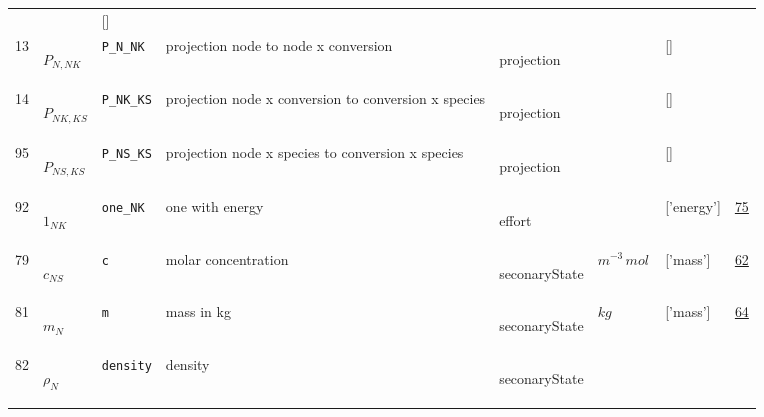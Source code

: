 \begin{longtable}{|p{1cm}|p{3cm}|p{3cm}|p{7cm}|p{3.0cm}|p{3cm}|p{2cm}|p{1cm}|}
             & $  $
             & []
             & \\
    13
             & \hypertarget{"v:13"}{ $ {P}_{N, {N K}} $}
             & \verb|P_N_NK|
             & projection node to node x conversion
             & \begin{lay}projection \end{lay}
             & $  $
             & []
             & \\
    14
             & \hypertarget{"v:14"}{ $ {P}_{{N K}, {K S}} $}
             & \verb|P_NK_KS|
             & projection node x conversion to conversion x
species
             & \begin{lay}projection \end{lay}
             & $  $
             & []
             & \\
    95
             & \hypertarget{"v:95"}{ $ {P}_{{N S}, {K S}} $}
             & \verb|P_NS_KS|
             & projection node x species to conversion x
species
             & \begin{lay}projection \end{lay}
             & $  $
             & []
             & \\
    92
             & \hypertarget{"v:92"}{ $ {1}_{{N K}} $}
             & \verb|one_NK|
             & one with energy
             & \begin{lay}effort \end{lay}
             & $  $
             & ['energy']
             & \hyperlink{"e:75"}{ 75 }
                 \\
    79
             & \hypertarget{"v:79"}{ $ {c}_{{N S}} $}
             & \verb|c|
             & molar concentration
             & \begin{lay}seconaryState \end{lay}
             & $ m^{-3} \,mol \, $
             & ['mass']
             & \hyperlink{"e:62"}{ 62 }
                 \\
    81
             & \hypertarget{"v:81"}{ $ {m}_{N} $}
             & \verb|m|
             & mass in kg
             & \begin{lay}seconaryState \end{lay}
             & $ kg \, $
             & ['mass']
             & \hyperlink{"e:64"}{ 64 }
                 \\
    82
             & \hypertarget{"v:82"}{ $ {\rho}_{N} $}
             & \verb|density|
             & density
             & \begin{lay}seconaryState \end{lay}

\end{longtable}
